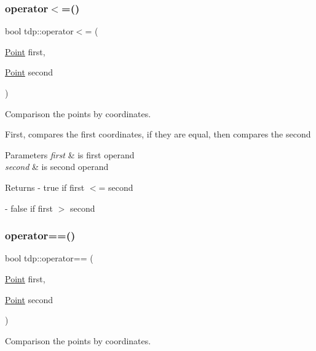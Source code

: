 \subsubsection{\texorpdfstring{operator$<$=()}{operator<=()}}
{\footnotesize\ttfamily bool tdp\+::operator$<$= (\begin{DoxyParamCaption}\item[{\mbox{\hyperlink{structtdp_1_1_point}{Point}}}]{first,  }\item[{\mbox{\hyperlink{structtdp_1_1_point}{Point}}}]{second }\end{DoxyParamCaption})}



Comparison the points by coordinates. 

First, compares the first coordinates, if they are equal, then compares the second 
\begin{DoxyParams}{Parameters}
{\em first} & is first operand \\
\hline
{\em second} & is second operand \\
\hline
\end{DoxyParams}
\begin{DoxyReturn}{Returns}
-\/ true if \textquotesingle{}first\textquotesingle{} $<$= \textquotesingle{}second\textquotesingle{} 

-\/ false if \textquotesingle{}first\textquotesingle{} $>$ \textquotesingle{}second\textquotesingle{} 
\end{DoxyReturn}
\mbox{\label{namespacetdp_ac28871640d9ee5c6f37f75be07b6d187}} 
\subsubsection{\texorpdfstring{operator==()}{operator==()}}
{\footnotesize\ttfamily bool tdp\+::operator== (\begin{DoxyParamCaption}\item[{\mbox{\hyperlink{structtdp_1_1_point}{Point}}}]{first,  }\item[{\mbox{\hyperlink{structtdp_1_1_point}{Point}}}]{second }\end{DoxyParamCaption})}



Comparison the points by coordinates. 

